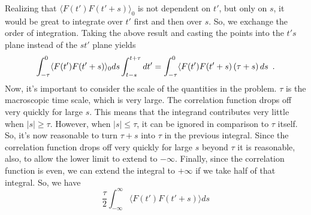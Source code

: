 \begin{homeworkProblem}
      Realizing that $ \langle F(t') F(t'+s) \rangle_{0} $ is not dependent on $
      t'$, but only on $ s $, it would be great to integrate over $ t' $ first
      and then over $ s $. So, we exchange the order of integration. Taking the
      above result and casting the points into the $ t's $ plane instead of the
      $ st' $ plane yields
      \[
         \int_{-\tau}^{0} \langle F(t') F(t'+s) \rangle_{0} ds
         \int_{t-s}^{t+\tau} dt'
         = \int_{-\tau}^{0} \langle F(t') F(t'+s) \left( \tau + s \right) ds
            \enskip.
      \]
      Now, it's important to consider the scale of the quantities in the
      problem. $ \tau $ is the macroscopic time scale, which is very large. The
      correlation function drops off very quickly for large $ s $. This means
      that the integrand contributes very little when $ |s| \ge \tau $. However,
      when $ |s| \le \tau $, it can be ignored in comparison to $ \tau $ itself.
      So, it's now reasonable to turn $ \tau + s $ into $ \tau $ in the previous
      integral. Since the correlation function drops off very quickly for large
      $ s $ beyond $ \tau $ it is reasonable, also, to allow the lower limit to
      extend to $ -\infty $. Finally, since the correlation function is even, we
      can extend the integral to $ + \infty $ if we take half of that integral.
      So, we have
      \[
         \frac{\tau}{2} \int_{-\infty}^{\infty} \langle F(t') F(t'+s) \rangle ds
      \]

 \end{homeworkProblem}
